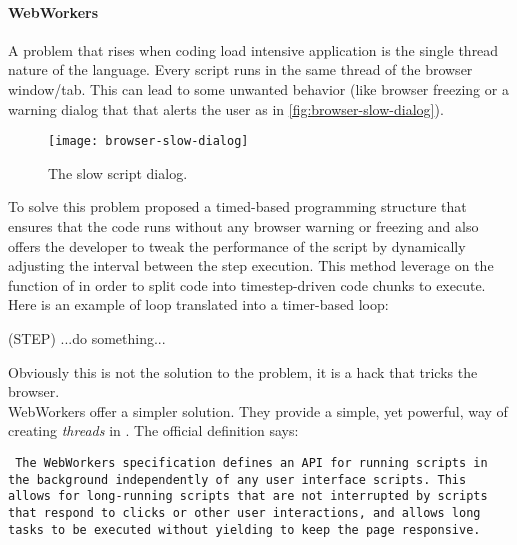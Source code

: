 \paragraph{WebWorkers}
A problem that rises when coding load intensive \js{} application is the single thread nature
of the language. Every script runs in the same thread of the browser window/tab.
This can lead to some unwanted behavior (like browser freezing or a warning
dialog that that alerts the user as in \autoref{fig:browser-slow-dialog}).
\begin{figure}[htb]
    \centering
    \texttt{[image: browser-slow-dialog]}
    \caption{The slow script dialog.}
    \label{fig:browser-slow-dialog}
\end{figure}
To solve this problem \cite{jenkin2008parasitic} proposed a timed-based
programming structure that ensures that the code runs without any browser warning
or freezing and also offers the developer to tweak the performance of the script
by dynamically adjusting the interval between the step execution. This method
leverage on the  function of \js{} in order to split code into
timestep-driven code chunks to execute. Here is an example of loop translated
into a timer-based loop:
\begin{multicols}{2}
	\begin{algorithm}[H]
	\end{algorithm}

	\vfill
	\columnbreak

	\begin{algorithm}[H]

		\procedure(STEP){
			...do something...\\
		}
	\end{algorithm}
\end{multicols}
Obviously this is not the solution to the problem, it is a hack that tricks the
browser.\\


WebWorkers offer a simpler solution. They provide a simple, yet powerful, way of
creating \emph{threads} in \js{}. The official definition says:
\begin{quoting}\rm\tt
	The WebWorkers specification defines an API for running scripts in the
	background independently of any user interface scripts.	This allows for
	long-running scripts that are not interrupted by scripts that respond to
	clicks or other user interactions, and allows long tasks to be executed
	without yielding to keep the page responsive.
\end{quoting}


